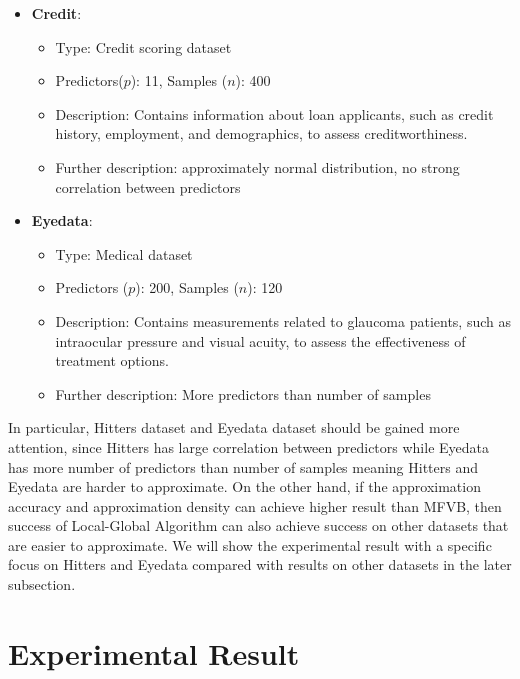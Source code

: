 \begin{itemize}
	\item \textbf{Credit}:
	\begin{itemize}
		\item Type: Credit scoring dataset
		\item Predictors($p$): 11, Samples ($n$): 400
		\item Description: Contains information about loan applicants, such as credit history, employment, and demographics, to assess creditworthiness.
		\item Further description: approximately normal distribution, no strong correlation between predictors
	\end{itemize}
	
	\item \textbf{Eyedata}:
	\begin{itemize}
		\item Type: Medical dataset
		\item Predictors ($p$): 200, Samples ($n$): 120
		\item Description: Contains measurements related to glaucoma patients, such as intraocular pressure and visual acuity, to assess the effectiveness of treatment options.
		\item Further description: More predictors than number of samples
	\end{itemize}
\end{itemize}

In particular, Hitters dataset and Eyedata dataset should be gained more attention, since Hitters has large correlation between predictors while Eyedata has more number of predictors than number of samples meaning Hitters and Eyedata are harder to approximate. On the other hand, if the approximation accuracy and approximation density can achieve higher result than MFVB, then success of Local-Global Algorithm can also achieve success on other datasets that are easier to approximate. We will show the experimental result with a specific focus on Hitters and Eyedata compared with results on other datasets in the later subsection.

\section{Experimental Result}

